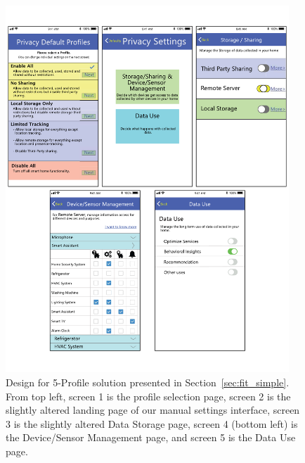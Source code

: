 \begin{figure}
	\centering
	\includegraphics[width=0.95\textwidth]{figures/cluster_simple.pdf}
	\caption{Design for 5-Profile solution presented in Section~\ref{sec:fit_simple}. From top left, screen 1 is the profile selection page, screen 2 is the slightly altered landing page of our manual settings interface, screen 3 is the slightly altered Data Storage page, screen 4 (bottom left) is the Device/Sensor Management page, and screen 5 is the Data Use page.}
	\label{fig:cluster_simple}
\end{figure}

